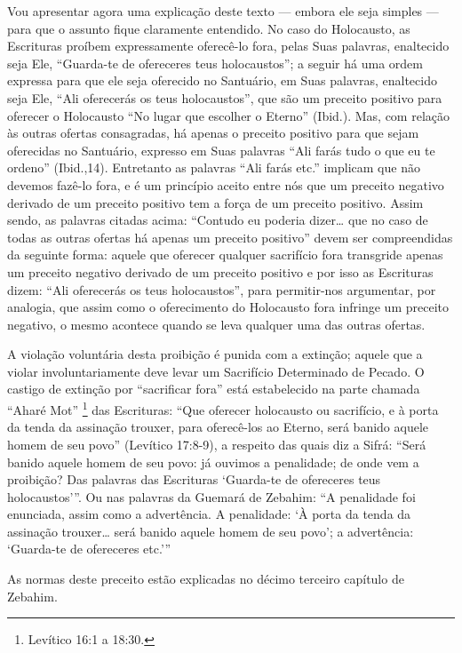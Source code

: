 Vou apresentar agora uma explicação deste texto --- embora ele seja
simples --- para que o assunto fique claramente entendido. No caso do
Holocausto, as Escrituras proíbem expressamente oferecê-lo fora, pelas
Suas palavras, enaltecido seja Ele, ``Guarda-te de ofereceres teus
holocaustos''; a seguir há uma ordem expressa para que ele seja
oferecido no Santuário, em Suas palavras, enaltecido seja Ele, ``Ali
oferecerás os teus holocaustos'', que são um preceito positivo para
oferecer o Holocausto ``No lugar que escolher o Eterno'' (Ibid.). Mas,
com relação às outras ofertas consagradas, há apenas o preceito
positivo para que sejam oferecidas no Santuário, expresso em Suas
palavras ``Ali farás tudo o que eu te ordeno'' (Ibid.,14). Entretanto as
palavras ``Ali farás etc.'' implicam que não devemos fazê-lo fora, e é
um princípio aceito entre nós que um preceito negativo derivado de um
preceito positivo tem a força de um preceito positivo. Assim sendo, as
palavras citadas acima: ``Contudo eu poderia dizer\ldots{} que no caso de
todas as outras ofertas há apenas um preceito positivo'' devem ser
compreendidas da seguinte forma: aquele que oferecer qualquer
sacrifício fora transgride apenas um preceito negativo derivado de um
preceito positivo e por isso as Escrituras dizem: ``Ali oferecerás os
teus holocaustos'', para permitir-nos argumentar, por analogia, que
assim como o oferecimento do Holocausto fora infringe um preceito
negativo, o mesmo acontece quando se leva qualquer uma das outras
ofertas.

A violação voluntária desta proibição é punida com a extinção; aquele
que a violar involuntariamente deve levar um Sacrifício Determinado de
Pecado. O castigo de extinção por ``sacrificar fora'' está estabelecido
na parte chamada ``Aharé Mot'' \footnote{Levítico 16:1 a 18:30.} das Escrituras:
``Que oferecer holocausto ou sacrifício, e à porta da tenda da assinação
trouxer, para oferecê-los ao Eterno, será banido aquele homem de seu
povo'' (Levítico 17:8-9), a respeito das quais diz a Sifrá: ``Será
banido aquele homem de seu povo: já ouvimos a penalidade; de onde vem a
proibição? Das palavras das Escrituras `Guarda-te de ofereceres teus
holocaustos'''. Ou nas palavras da Guemará de Zebahim: ``A penalidade
foi enunciada, assim como a advertência. A penalidade: `À porta da tenda
da assinação trouxer\ldots{} será banido aquele homem de seu povo'; a
advertência: `Guarda-te de ofereceres etc.'''

As normas deste preceito estão explicadas no décimo terceiro capítulo
de Zebahim.

